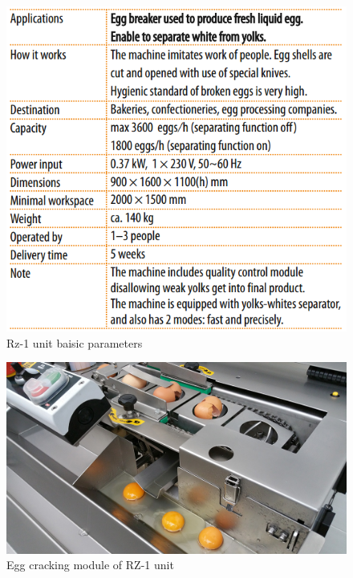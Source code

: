 \documentclass[12pt,twoside,a4paper]{article}
\begin{document}
\begin{figure}[H]
\centering
\includegraphics[width=0.4\paperwidth]{rz1table}
\caption{Rz-1 unit baisic parameters}
\end{figure}


\begin{figure}[H]
\centering
\includegraphics[width=0.4\paperwidth]{rz1crack}
\caption{Egg cracking  module of RZ-1 unit}
\end{figure}
\end{document}
